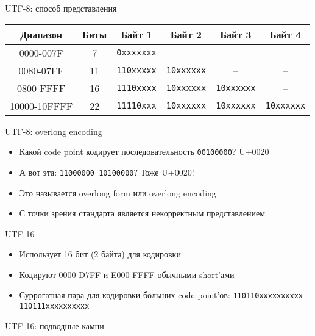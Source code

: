 \documentclass[10pt,pdf,hyperref={unicode}]{beamer}
\begin{document}
\begin{frame}{UTF-8: способ представления}
\begin{center}
\begin{tabular}{ |c|c|c|c|c|c| }
\hline
Диапазон & Биты & Байт 1 & Байт 2 & Байт 3 & Байт 4 \\
\hline
0000-007F & 7 & \lstinline{0xxxxxxx} & -- & -- & -- \\
\hline
0080-07FF & 11 & \lstinline{110xxxxx} & \lstinline{10xxxxxx} & -- & -- \\
\hline
0800-FFFF & 16 & \lstinline{1110xxxx} & \lstinline{10xxxxxx} & \lstinline{10xxxxxx} & -- \\
\hline
10000-10FFFF & 22 & \lstinline{11110xxx} & \lstinline{10xxxxxx} & \lstinline{10xxxxxx} & \lstinline{10xxxxxx} \\
\hline
\end{tabular}
\end{center}
\end{frame}

\begin{frame}{UTF-8: overlong encoding}
\begin{itemize}
    \item Какой code point кодирует последовательность \lstinline{00100000}? U+0020
    \item А вот эта: \lstinline{11000000 10100000}? Тоже U+0020!
    \item Это называется overlong form или overlong encoding
    \item С точки зрения стандарта является некорректным представлением
\end{itemize}
\end{frame}


\begin{frame}{UTF-16}
\begin{itemize}
    \item Использует 16 бит (2 байта) для кодировки
    \item Кодируют 0000-D7FF и E000-FFFF обычными short'ами
    \item Суррогатная пара для кодировки больших code point'ов: \lstinline{110110xxxxxxxxxx 110111xxxxxxxxxx}
\end{itemize}
\end{frame}

\begin{frame}{UTF-16: подводные камни}
\center{}
\end{frame}
\end{document}
